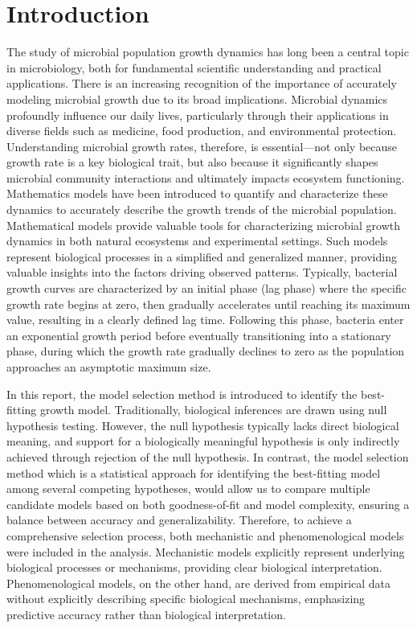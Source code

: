 \documentclass{article}
\begin{document}
\section{Introduction}
The study of microbial population growth dynamics has long been a central topic in microbiology, both for fundamental scientific understanding and practical applications.\cite{monod1949growth} There is an increasing recognition of the importance of accurately modeling microbial growth due to its broad implications. Microbial dynamics profoundly influence our daily lives, particularly through their applications in diverse fields such as medicine, food production, and environmental protection. Understanding microbial growth rates, therefore, is essential—not only because growth rate is a key biological trait, but also because it significantly shapes microbial community interactions and ultimately impacts ecosystem functioning.\cite{lipson2015complex} Mathematics models have been introduced to quantify and characterize these dynamics to accurately describe the growth trends of the microbial population. Mathematical models provide valuable tools for characterizing microbial growth dynamics in both natural ecosystems and experimental settings.\cite{wachenheim2003analysis} Such models represent biological processes in a simplified and generalized manner, providing valuable insights into the factors driving observed patterns. \cite{johnson2004model}  Typically, bacterial growth curves are characterized by an initial phase (lag phase) where the specific growth rate begins at zero, then gradually accelerates until reaching its maximum value, resulting in a clearly defined lag time. Following this phase, bacteria enter an exponential growth period before eventually transitioning into a stationary phase, during which the growth rate gradually declines to zero as the population approaches an asymptotic maximum size.

In this report, the model selection method is introduced to identify the best-fitting growth model. Traditionally, biological inferences are drawn using null hypothesis testing.
However, the null hypothesis typically lacks direct biological meaning, and support for a biologically meaningful hypothesis is only indirectly achieved through rejection of the null hypothesis. \cite{johnson2004model} In contrast, the model selection method which is a statistical approach for identifying the best-fitting model among several competing hypotheses, would allow us to compare multiple candidate models based on both goodness-of-fit and model complexity, ensuring a balance between accuracy and generalizability. Therefore, to achieve a comprehensive selection process, both mechanistic and phenomenological models were included in the analysis. Mechanistic models explicitly represent underlying biological processes or mechanisms, providing clear biological interpretation. Phenomenological models, on the other hand, are derived from empirical data without explicitly describing specific biological mechanisms, emphasizing predictive accuracy rather than biological interpretation.
\end{document}
